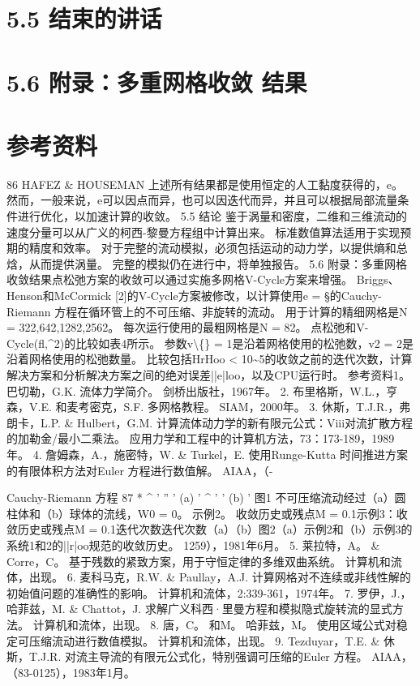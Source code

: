 \documentclass[UTF8,11pt,a4paper,openany,fontset=fandol]{ctexbook}
\begin{document}
\section{5.5 结束的讲话}
\section{5.6 附录：多重网格收敛 结果}
\section{参考资料}
86 HAFEZ \& HOUSEMAN 上述所有结果都是使用恒定的人工黏度获得的，e。 然而，一般来说，e可以因点而异，也可以因迭代而异，并且可以根据局部流量条件进行优化，以加速计算的收敛。 5.5 结论 鉴于涡量和密度，二维和三维流动的速度分量可以从广义的柯西-黎曼方程组中计算出来。 标准数值算法适用于实现预期的精度和效率。 对于完整的流动模拟，必须包括运动的动力学，以提供熵和总焓，从而提供涡量。 完整的模拟仍在进行中，将单独报告。 5.6 附录：多重网格收敛结果点松弛方案的收敛可以通过实施多网格V-Cycle方案来增强。 Briggs、Henson和McCormick [2]的V-Cycle方案被修改，以计算使用e = §的Cauchy-Riemann 方程在循环管上的不可压缩、非旋转的流动。 用于计算的精细网格是N = 322,642,1282,2562。 每次运行使用的最粗网格是N = 82。 点松弛和V-Cycle(fl,\textasciicircum{}2)的比较如表4所示。 参数v\textbackslash\{\} = 1是沿着网格使用的松弛数，v2 = 2是沿着网格使用的松弛数量。 比较包括HrHoo < 10\textasciitilde{}5的收敛之前的迭代次数，计算解决方案和分析解决方案之间的绝对误差||e|loo，以及CPU运行时。 参考资料1。 巴切勒，G.K. 流体力学简介。 剑桥出版社，1967年。 2. 布里格斯，W.L.，亨森，V.E. 和麦考密克，S.F. 多网格教程。 SIAM，2000年。 3. 休斯，T.J.R.，弗朗卡，L.P. \& Hulbert，G.M. 计算流体动力学的新有限元公式：Viii对流扩散方程的加勒金/最小二乘法。 应用力学和工程中的计算机方法，73：173-189，1989年。 4. 詹姆森，A.，施密特，W. \& Turkel，E. 使用Runge-Kutta 时间推进方案的有限体积方法对Euler 方程进行数值解。 AIAA，（-

Cauchy-Riemann 方程 87 * \textasciicircum{} ' '' ' (a) ' \textasciicircum{} ' ' (b) ' 图1 不可压缩流动经过（a）圆柱体和（b）球体的流线，W0 = 0。 示例2。 收敛历史或残点M = 0.1示例3：收敛历史或残点M = 0.1迭代次数迭代次数（a）（b）图2（a）示例2和（b）示例3的系统1和2的||r|oo规范的收敛历史。 1259），1981年6月。 5. 莱拉特，A。 \& Corre，C。 基于残数的紧致方案，用于守恒定律的多维双曲系统。 计算机和流体，出现。 6. 麦科马克，R.W. \& Paullay，A.J. 计算网格对不连续或非线性解的初始值问题的准确性的影响。 计算机和流体，2:339-361，1974年。 7. 罗伊，J.，哈菲兹，M. \& Chattot，J. 求解广义科西·里曼方程和模拟隐式旋转流的显式方法。 计算机和流体，出现。 8. 唐，C。 和M。 哈菲兹，M。 使用区域公式对稳定可压缩流动进行数值模拟。 计算机和流体，出现。 9. Tezduyar，T.E. \& 休斯，T.J.R. 对流主导流的有限元公式化，特别强调可压缩的Euler 方程。 AIAA，（83-0125），1983年1月。
\end{document}
